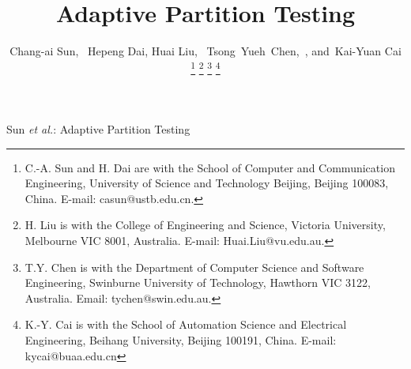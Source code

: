 \documentclass[10pt,journal,compsoc]{IEEEtran}
\begin{document}
\title{Adaptive Partition Testing}

\author{Chang-ai Sun,~
        Hepeng Dai,
        Huai Liu,~
        Tsong~Yueh~Chen,~,
        and~Kai-Yuan Cai
\thanks{C.-A. Sun and H. Dai are with the School of Computer and Communication Engineering, University of Science and Technology Beijing, Beijing 100083, China. E-mail: casun@ustb.edu.cn.}
\thanks{H. Liu is with the College of Engineering and Science, Victoria University, Melbourne VIC 8001, Australia. E-mail: Huai.Liu@vu.edu.au.}
\thanks{T.Y. Chen is with the Department of Computer Science and Software Engineering, Swinburne University of Technology, Hawthorn VIC 3122, Australia. Email: tychen@swin.edu.au.}
\thanks{K.-Y. Cai is with the School of Automation Science and Electrical Engineering, Beihang University, Beijing 100191, China. E-mail: kycai@buaa.edu.cn}}

%
{Sun \MakeLowercase{\textit{et al.}}: Adaptive Partition Testing}
\end{document}
